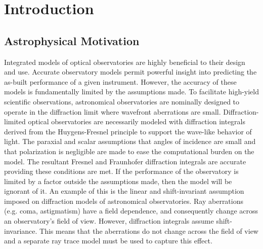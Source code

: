 \section{Introduction}
\label{sec:intro}  %
\subsection{Astrophysical Motivation}

Integrated models of optical observatories are highly beneficial to their design and use\cite{andersen_integrated_2011,Dube2022}. Accurate observatory models permit powerful insight into predicting the as-built performance of a given instrument. However, the accuracy of these models is fundamentally limited by the assumptions made. To facilitate high-yield scientific observations, astronomical observatories are nominally designed to operate in the diffraction limit where wavefront aberrations are small. Diffraction-limited optical observatories are necessarily modeled with diffraction integrals derived from the Huygens-Fresnel principle to support the wave-like behavior of light. The paraxial and scalar assumptions that angles of incidence are small and that polarization is negligible\cite{goodman17} are made to ease the computational burden on the model. The resultant Fresnel and Fraunhofer diffraction integrals are accurate providing these conditions are met. If the performance of the observatory is limited by a factor outside the assumptions made, then the model will be ignorant of it. An example of this is the linear and shift-invariant assumption imposed on diffraction models of astronomical observatories. Ray aberrations (e.g. coma, astigmatism) have a field dependence, and consequently change across an observatory's field of view. However, diffraction integrals assume shift-invariance. This means that the aberrations do not change across the field of view and a separate ray trace model must be used to capture this effect.

